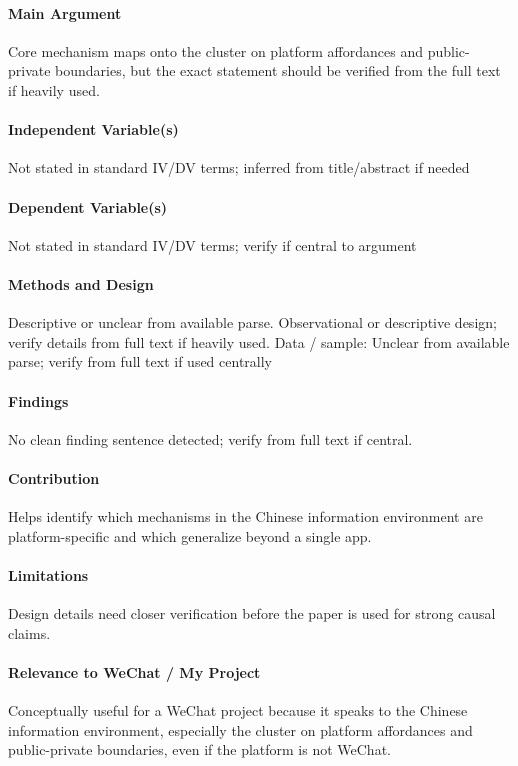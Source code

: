 \documentclass[12pt]{article}
\begin{document}
\paragraph{Main Argument} Core mechanism maps onto the cluster on platform affordances and public-private boundaries, but the exact statement should be verified from the full text if heavily used.

\paragraph{Independent Variable(s)} Not stated in standard IV/DV terms; inferred from title/abstract if needed

\paragraph{Dependent Variable(s)} Not stated in standard IV/DV terms; verify if central to argument

\paragraph{Methods and Design} Descriptive or unclear from available parse. Observational or descriptive design; verify details from full text if heavily used. Data / sample: Unclear from available parse; verify from full text if used centrally

\paragraph{Findings} No clean finding sentence detected; verify from full text if central.

\paragraph{Contribution} Helps identify which mechanisms in the Chinese information environment are platform-specific and which generalize beyond a single app.

\paragraph{Limitations} Design details need closer verification before the paper is used for strong causal claims.

\paragraph{Relevance to WeChat / My Project} Conceptually useful for a WeChat project because it speaks to the Chinese information environment, especially the cluster on platform affordances and public-private boundaries, even if the platform is not WeChat.
\end{document}
